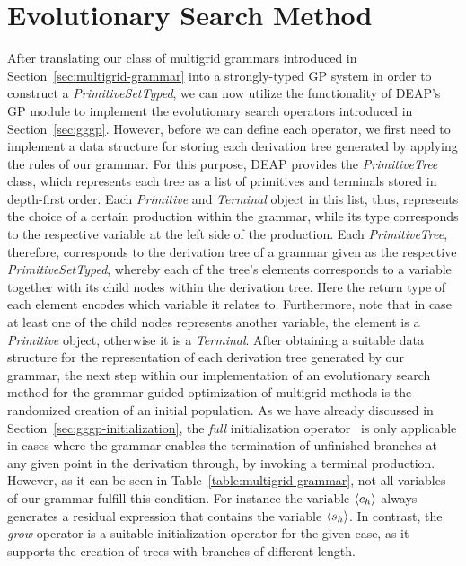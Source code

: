 \section{Evolutionary Search Method}
After translating our class of multigrid grammars introduced in Section~\ref{sec:multigrid-grammar} into a strongly-typed GP system in order to construct a \emph{PrimitiveSetTyped}, we can now utilize the functionality of DEAP's GP module to implement the evolutionary search operators introduced in Section~\ref{sec:gggp}.
However, before we can define each operator, we first need to implement a data structure for storing each derivation tree generated by applying the rules of our grammar.
For this purpose, DEAP provides the \emph{PrimitiveTree} class, which represents each tree as a list of primitives and terminals stored in depth-first order.
Each \emph{Primitive} and \emph{Terminal} object in this list, thus, represents the choice of a certain production within the grammar, while its type corresponds to the respective variable at the left side of the production.
Each \emph{PrimitiveTree}, therefore, corresponds to the derivation tree of a grammar given as the respective \emph{PrimitiveSetTyped}, whereby each of the tree's elements corresponds to a variable together with its child nodes within the derivation tree.
Here the return type of each element encodes which variable it relates to.
Furthermore, note that in case at least one of the child nodes represents another variable, the element is a \emph{Primitive} object, otherwise it is a \emph{Terminal}.
After obtaining a suitable data structure for the representation of each derivation tree generated by our grammar, the next step within our implementation of an evolutionary search method for the grammar-guided optimization of multigrid methods is the randomized creation of an initial population.
As we have already discussed in Section~\ref{sec:gggp-initialization}, the \emph{full} initialization operator~\cite{koza1994genetic,poli2008field} is only applicable in cases where the grammar enables the termination of unfinished branches at any given point in the derivation through, by invoking a terminal production.
However, as it can be seen in Table~\ref{table:multigrid-grammar}, not all variables of our grammar fulfill this condition.
For instance the variable $\langle c_h \rangle$ always generates a residual expression that contains the variable $\langle s_h \rangle$.
In contrast, the \emph{grow} operator is a suitable initialization operator for the given case, as it supports the creation of trees with branches of different length. 
